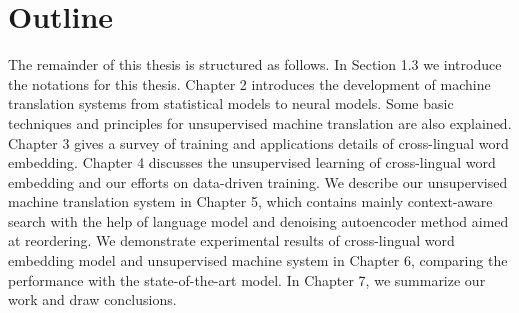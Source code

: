 \section{Outline}
The remainder of this thesis is structured as follows. In Section 1.3 we introduce the notations for this thesis. 
Chapter 2 introduces the development of machine translation systems from statistical models to  neural models. Some basic techniques and principles for unsupervised machine translation are also explained.  Chapter 3 gives a survey of training and applications details of cross-lingual word embedding. Chapter 4 discusses the unsupervised learning of cross-lingual word embedding and our efforts on data-driven training. We describe our unsupervised machine translation system in Chapter 5, which contains mainly context-aware search with the help of language model and denoising autoencoder method aimed at reordering. We demonstrate experimental results of cross-lingual word embedding model and unsupervised machine system in Chapter 6, comparing the performance with the state-of-the-art model. In Chapter 7, we summarize our work and draw conclusions.


